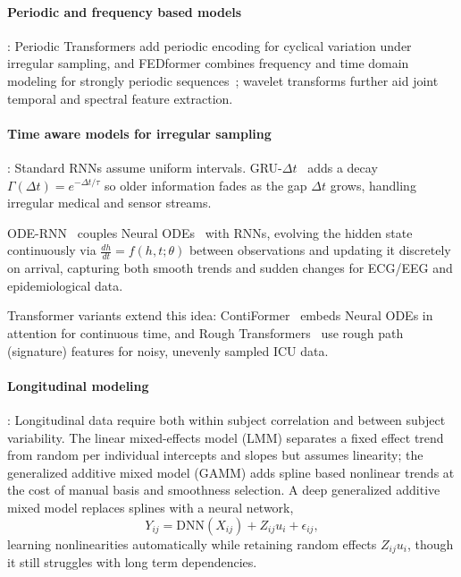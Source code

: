 \documentclass[journal]{IEEEtran}
\providecommand{\Description}[1]{}
\begin{document}
\paragraph{Periodic and frequency based models}: Periodic Transformers add periodic encoding for cyclical variation under irregular sampling, and FEDformer combines frequency and time domain modeling for strongly periodic sequences~\cite{zhou2022fedformer}; wavelet transforms further aid joint temporal and spectral feature extraction.

\paragraph{Time aware models for irregular sampling}: Standard RNNs assume uniform intervals. GRU-$\Delta t$~\cite{metzger2023crop} adds a decay $\Gamma(\Delta t)=e^{-\Delta t/\tau}$ so older information fades as the gap $\Delta t$ grows, handling irregular medical and sensor streams.

ODE-RNN~\cite{rubanova2019latent} couples Neural ODEs~\cite{chen2018neural} with RNNs, evolving the hidden state continuously via $\frac{dh}{dt}=f(h,t;\theta)$ between observations and updating it discretely on arrival, capturing both smooth trends and sudden changes for ECG/EEG and epidemiological data.

Transformer variants extend this idea: ContiFormer~\cite{chen2023contiformer} embeds Neural ODEs in attention for continuous time, and Rough Transformers~\cite{morenopino2024rough} use rough path (signature) features for noisy, unevenly sampled ICU data.



\paragraph{Longitudinal modeling}: Longitudinal data require both within subject correlation and between subject variability. The linear mixed-effects model (LMM) separates a fixed effect trend from random per individual intercepts and slopes but assumes linearity; the generalized additive mixed model (GAMM) adds spline based nonlinear trends at the cost of manual basis and smoothness selection. A deep generalized additive mixed model replaces splines with a neural network,
\[
Y_{ij} = \mathrm{DNN}(X_{ij}) + Z_{ij} u_i + \epsilon_{ij},
\]
learning nonlinearities automatically while retaining random effects $Z_{ij}u_i$, though it still struggles with long term dependencies.
\end{document}
